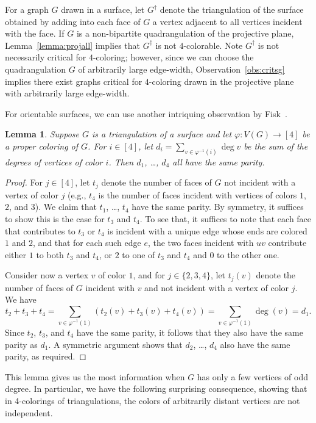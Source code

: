 \documentclass[12pt,twoside,openright,a4paper]{book}
\newtheorem{lemma}[theorem]{Lemma}
\begin{document}
For a graph $G$ drawn in a surface, let $G^\dagger$ denote the triangulation of the surface obtained by adding
into each face of $G$ a vertex adjacent to all vertices incident with the face.  If $G$ is a non-bipartite quadrangulation
of the projective plane, Lemma~\ref{lemma:projall} implies that $G^\dagger$ is not $4$-colorable.  Note $G^\dagger$ is not
necessarily critical for $4$-coloring; however, since we can choose the quadrangulation $G$ of arbitrarily large edge-width,
Observation~\ref{obs:critsg} implies there exist graphs critical for $4$-coloring drawn in the projective plane with arbitrarily
large edge-width.

For orientable surfaces, we can use another intriquing observation by Fisk~\cite{Fisk78}.

\begin{lemma}\label{lemma:oddsame}
Suppose $G$ is a triangulation of a surface and let $\varphi:V(G)\to[4]$ be a proper coloring of $G$.
For $i\in[4]$, let $d_i=\sum_{v\in \varphi^{-1}(i)} \deg v$ be the sum of the degrees of vertices of color $i$.  Then $d_1$, \ldots, $d_4$ all have the same parity.
\end{lemma}
\begin{proof}
For $j\in[4]$, let $t_j$ denote the number of faces of $G$ not incident with a vertex of color $j$ (e.g., $t_4$
is the number of faces incident with vertices of colors $1$, $2$, and $3$).
We claim that $t_1$, \ldots, $t_4$ have the same parity.  By symmetry, it suffices to show this is the case for $t_3$ and $t_4$.
To see that, it suffices to note that each face that contributes to $t_3$ or $t_4$ is incident with a unique edge
whose ends are colored $1$ and $2$, and that for each such edge $e$, the two faces incident with $uv$ contribute either
$1$ to both $t_3$ and $t_4$, or $2$ to one of $t_3$ and $t_4$ and $0$ to the other one.

Consider now a vertex $v$ of color $1$, and for $j\in \{2,3,4\}$, let $t_j(v)$ denote the number of faces of
$G$ incident with $v$ and not incident with a vertex of color $j$.  We have
$$t_2+t_3+t_4=\sum_{v\in \varphi^{-1}(1)} (t_2(v)+t_3(v)+t_4(v))=\sum_{v\in \varphi^{-1}(1)} \deg(v)=d_1.$$
Since $t_2$, $t_3$, and $t_4$ have the same parity, it follows that they also have the same parity as $d_1$.
A symmetric argument shows that $d_2$, \ldots, $d_4$ also have the same parity, as required.
\end{proof}
This lemma gives us the most information when $G$ has only a few vertices of odd degree.
In particular, we have the following surprising consequence, showing that in 4-colorings of triangulations,
the colors of arbitrarily distant vertices are not independent.
\end{document}
